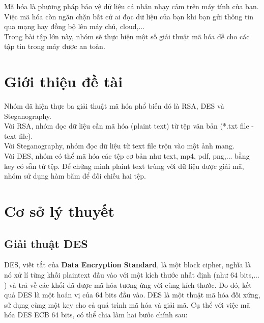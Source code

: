 \documentclass[a4paper]{article}
\begin{document}

\newpage
\tableofcontents
\newpage

Mã hóa là phương pháp bảo vệ dữ liệu cá nhân nhạy cảm trên máy tính của bạn. Việc mã hóa còn ngăn chặn bất cứ ai đọc dữ liệu của bạn khi bạn gửi thông tin qua mạng hay đồng bộ lên máy chủ, cloud,...\\

Trong bài tập lớn này, nhóm sẽ thực hiện một số giải thuật mã hóa dễ cho các tập tin trong máy được an toàn.

\section{Giới thiệu đề tài}
Nhóm đã hiện thực ba giải thuật mã hóa phổ biến đó là RSA, DES và Steganography.\\

Với RSA, nhóm đọc dữ liệu cần mã hóa (plaint text) từ tệp văn bản (*.txt file - text file).\\
Với Steganography, nhóm đọc dữ liệu từ text file trộn vào một ảnh mang.\\
Với DES, nhóm có thể mã hóa các tệp cơ bản như text, mp4, pdf, png,... bằng key có sẵn từ tệp.
Để chứng minh plaint text trùng với dữ liệu được giải mã, nhóm sử dụng hàm băm để đối chiếu hai tệp.
\section{Cơ sở lý thuyết}
\subsection{Giải thuật DES}
DES, viết tắt của \textbf{Data Encryption Standard}, là một block cipher, nghĩa là nó xử lí từng khối plaintext đầu vào với một kích thước nhất định (như 64 bits,... ) và trả về các khối đã được mã hóa tương ứng với cùng kích thước. Do đó, kết quả DES là một hoán vị của 64 bits đầu vào. DES là một thuật mã hóa đối xứng, sử dụng cùng một key cho cả quá trình mã hóa và giải mã. Cụ thể với việc mã hóa DES ECB 64 bits, có thể chia làm hai bước chính sau:
\end{document}
